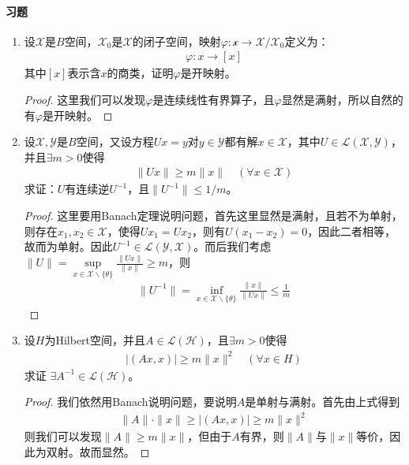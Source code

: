 	\paragraph{习题}
	\begin{enumerate}[leftmargin=2cm, label=\arabic*]
		\item 设$\mathscr{X}$是$B$空间，$\mathscr{X}_0$是$\mathscr{X}$的闭子空间，映射$\varphi:\mathscr{x}\to\mathscr{X}/\mathscr{X}_0$定义为：
		\begin{align*}
			\varphi: x\to [x]
		\end{align*}
		其中$[x]$表示含$x$的商类，证明$\varphi$是开映射。
		\begin{proof}
			这里我们可以发现$\varphi$是连续线性有界算子，且$\varphi$显然是满射，所以自然的有$\varphi$是开映射。
		\end{proof}
		
		\item 设$\mathscr{X},\mathscr{Y}$是$B$空间，又设方程$Ux = y$对$y\in\mathscr{Y}$都有解$x\in\mathscr{X}$，其中$U\in\mathscr{L}(\mathscr{X},\mathscr{Y})$，并且$\exists m>0$使得
		\begin{align*}
			\|Ux\| \geqslant m\|x\| \quad (\forall x\in\mathscr{X})
		\end{align*}
		求证：$U$有连续逆$U^{-1}$，且$\|U^{-1}\|\leqslant 1/m$。
		\begin{proof}
			这里要用Banach定理说明问题，首先这里显然是满射，且若不为单射，则存在$x_1,x_2\in\mathscr{X}$，使得$Ux_1 = Ux_2$，则有$U(x_1 - x_2)= 0$，因此二者相等，故而为单射。因此$U^{-1}\in\mathscr{L}(\mathscr{Y},\mathscr{X})$。而后我们考虑$\|U\| = \sup\limits_{x\in\mathscr{X}\backslash\{\theta\}}\frac{\|Ux\|}{\|x\|}\geqslant m$，则
			\begin{align*}
				\|U^{-1}\| = \inf\limits_{x\in\mathscr{X}\backslash\{\theta\}} \frac{\|x\|}{\|Ux\|} \leqslant \frac{1}{m}
			\end{align*}
		\end{proof}
		
		\item 设$H$为Hilbert空间，并且$A\in\mathscr{L}(\mathscr{H})$，且$\exists m>0$使得
		\begin{align*}
			|(Ax,x)| \geqslant m\|x\|^2 \quad (\forall x\in H)
		\end{align*}
		求证 $\exists A^{-1}\in\mathscr{L}(\mathscr{H})$。
		\begin{proof}
			我们依然用Banach说明问题，要说明$A$是单射与满射。首先由上式得到
			\begin{align*}
				\|A\| \cdot \|x\| \geqslant |(Ax,x)| \geqslant m\|x\|^2
			\end{align*}
			则我们可以发现$\|A\| \geqslant m\|x\|$，但由于$A$有界，则$\|A\|$与$\|x\|$等价，因此为双射。故而显然。
		\end{proof}
		

\end{enumerate}
